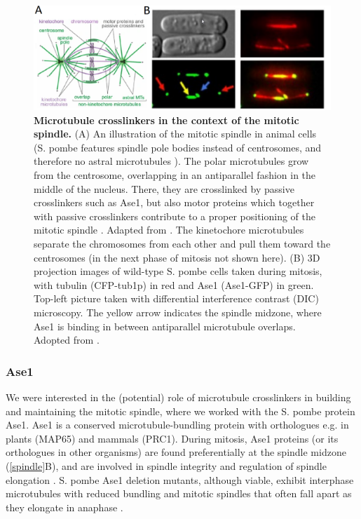 \begin{figure}[h!tb]
	\centering
	\includegraphics[width=\linewidth]{Figures/spindle.png}
	\caption[Microtubule crosslinkers in the context of the mitotic spindle.]{\textbf{Microtubule crosslinkers in the context of the mitotic spindle.}
	(A) An illustration of the mitotic spindle in animal cells (S. pombe features spindle pole bodies instead of centrosomes, and therefore no astral microtubules \parencite{Kilmartin2014}). The polar microtubules grow from the centrosome, overlapping in an antiparallel fashion in the middle of the nucleus. There, they are crosslinked by passive crosslinkers such as Ase1, but also motor proteins which together with passive crosslinkers contribute to a proper positioning of the mitotic spindle \parencite{Janson2007,Braun2011}. Adapted from \cite{Tolic2018}. The kinetochore microtubules separate the chromosomes from each other and pull them toward the centrosomes (in the next phase of mitosis not shown here). (B) 3D projection images of wild-type S. pombe cells taken during mitosis, with tubulin (CFP-tub1p) in red and Ase1 (Ase1-GFP) in green. Top-left picture taken with differential interference contrast (DIC) microscopy. The yellow arrow indicates the spindle midzone, where Ase1 is binding in between antiparallel microtubule overlaps. Adopted from \cite{Loiodice2005}.
		}\label{spindle}
\end{figure}

\subsubsection{Ase1}
\label{sec:Ase1_intro}
We were interested in the (potential) role of microtubule crosslinkers in building and maintaining the mitotic spindle, where we worked with the S. pombe protein Ase1. Ase1 is a conserved microtubule-bundling protein with orthologues e.g. in plants (MAP65) and mammals (PRC1). During mitosis, Ase1 proteins (or its orthologues in other organisms) are found preferentially at the spindle midzone (\autoref{spindle}B), and are involved in spindle integrity and regulation of spindle elongation \parencite{Loiodice2005,Yamashita2005,She2019}. S. pombe Ase1 deletion mutants, although viable, exhibit interphase microtubules with reduced bundling and mitotic spindles that often fall apart as they elongate in anaphase \parencite{Loiodice2005,Yamashita2005}. \par

